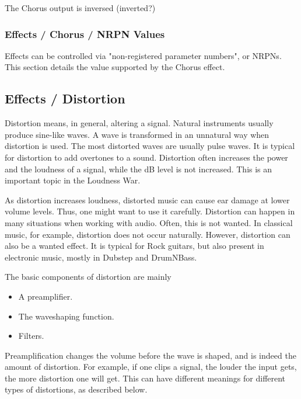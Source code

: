    The Chorus output is inversed (inverted?)

\subsubsection{Effects / Chorus / NRPN Values}
\label{subsubsec:effects_edit_chorus_nrpn}

Effects can be controlled via "non-registered parameter numbers", or NRPNs.
This section details the value supported by the Chorus effect.

\subsection{Effects / Distortion}
\label{subsec:effects_edit_distortion}

   Distortion means, in general, altering a signal. Natural instruments
   usually produce sine-like waves. A wave is transformed in an unnatural way
   when distortion is used. The most distorted waves are usually pulse waves.
   It is typical for distortion to add overtones to a sound. Distortion often
   increases the power and the loudness of a signal, while the dB level is
   not increased. This is an important topic in the Loudness War.

   As distortion increases loudness, distorted music can cause ear damage at
   lower volume levels. Thus, one might want to use it carefully.
   Distortion can happen in many situations when working with audio. Often,
   this is not wanted. In classical music, for example, distortion does not
   occur naturally. However, distortion can also be a wanted effect. It is
   typical for Rock guitars, but also present in electronic music, mostly in
   Dubstep and DrumNBass.

   The basic components of distortion are mainly

   \begin{itemize}
      \item A preamplifier.
      \item The waveshaping function.
      \item Filters.
   \end{itemize}

   Preamplification changes the volume before the wave is shaped, and is
   indeed the amount of distortion. For example, if one clips a signal, the
   louder the input gets, the more distortion one will get. This can have
   different meanings for different types of distortions, as described below.

